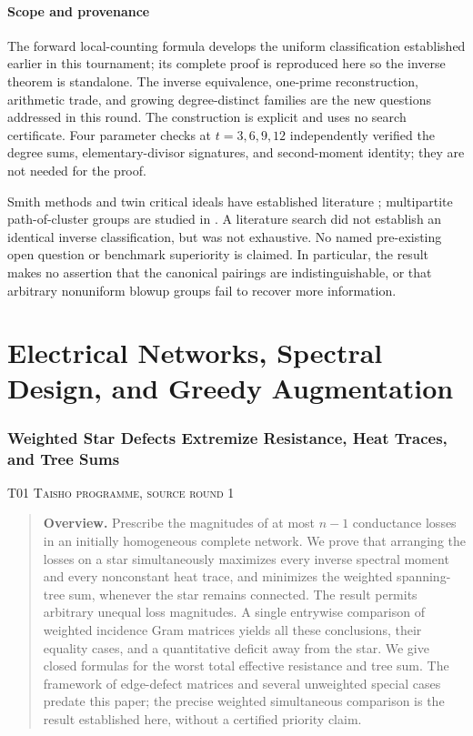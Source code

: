 \documentclass[11pt,a4paper]{article}
\theoremstyle{definition}\newtheorem{definition}[theorem]{Definition}
\theoremstyle{remark}\newtheorem{remark}[theorem]{Remark}
\numberwithin{equation}{section}
\begin{document}
\subsection{Scope and provenance}\label{K10-sec-6}
The forward local-counting formula develops the uniform classification established earlier in this tournament; its complete proof is reproduced here so the inverse theorem is standalone. The inverse equivalence, one-prime reconstruction, arithmetic trade, and growing degree-distinct families are the new questions addressed in this round. The construction is explicit and uses no search certificate. Four parameter checks at $t=3,6,9,12$ independently verified the degree sums, elementary-divisor signatures, and second-moment identity; they are not needed for the proof.

Smith methods and twin critical ideals have established literature \cite{ref030,ref029,ref035}; multipartite path-of-cluster groups are studied in \cite{ref028}. A literature search did not establish an identical inverse classification, but was not exhaustive. No named pre-existing open question or benchmark superiority is claimed. In particular, the result makes no assertion that the canonical pairings are indistinguishable, or that arbitrary nonuniform blowup groups fail to recover more information.




\clearpage
\part{Electrical Networks, Spectral Design, and Greedy Augmentation}


\clearpage
\section[T01 --- Weighted Star Defects Extremize Resistance, Heat Traces, and Tree Sums]{Weighted Star Defects Extremize Resistance, Heat Traces, and Tree Sums}\label{contrib-T01}
\noindent\textsc{T01 \quad Taisho programme, source round 1}\par\medskip



\begin{quote}\small\textbf{Overview.} Prescribe the magnitudes of at most $n-1$ conductance losses in an initially homogeneous complete network. We prove that arranging the losses on a star simultaneously maximizes every inverse spectral moment and every nonconstant heat trace, and minimizes the weighted spanning-tree sum, whenever the star remains connected. The result permits arbitrary unequal loss magnitudes. A single entrywise comparison of weighted incidence Gram matrices yields all these conclusions, their equality cases, and a quantitative deficit away from the star. We give closed formulas for the worst total effective resistance and tree sum. The framework of edge-defect matrices and several unweighted special cases predate this paper; the precise weighted simultaneous comparison is the result established here, without a certified priority claim.\end{quote}
\end{document}
